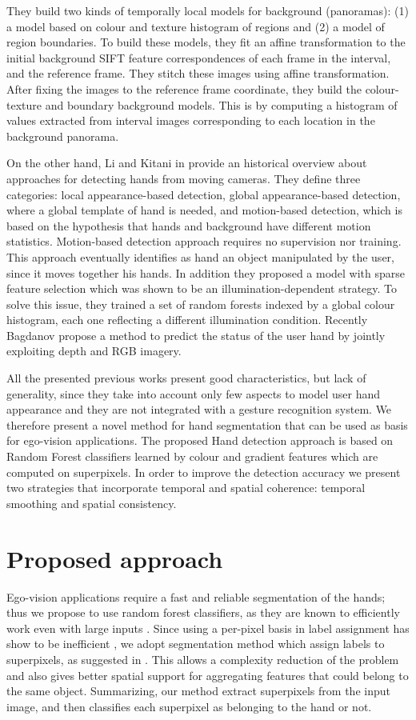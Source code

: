 They build two kinds of temporally local models for background
(panoramas): (1) a model based on colour and texture
histogram of regions and (2) a model of region boundaries.
To build these models, they fit an affine transformation
to the initial background SIFT feature correspondences of
each frame in the interval, and the reference frame. They
stitch these images using affine transformation. After fixing
the images to the reference frame coordinate, they build
the colour-texture and boundary background models. This is
by computing a histogram of values extracted from interval
images corresponding to each location in the background
panorama.

On the other hand, Li and Kitani in \cite{li13} provide an historical overview about approaches for detecting hands from moving cameras. They define three categories: local appearance-based detection, global appearance-based detection, where a global template of hand is needed, and motion-based detection, which is based on the hypothesis that hands and background have different motion statistics. Motion-based detection approach requires no supervision nor training. This approach eventually identifies as hand an object manipulated by the user, since it moves together his hands. In addition they proposed a model with sparse feature selection which was shown to be an illumination-dependent strategy. To solve this issue, they trained a set of random forests indexed by a global colour histogram, each one reflecting a different illumination condition.
Recently Bagdanov \etal \cite{bagdanov12} propose a method to predict the status of the user hand by jointly exploiting depth and RGB imagery.

All the presented previous works present good characteristics, but lack of generality, since they take into account only few aspects to model user hand appearance and they are not integrated with a gesture recognition system. We therefore present a novel method for hand segmentation that can be used as basis for ego-vision applications. 
The proposed Hand detection approach is based on Random Forest classifiers learned by colour and gradient features which are computed on superpixels. In order to improve the detection accuracy we present two strategies that incorporate temporal and spatial coherence: temporal smoothing and spatial consistency.

\section{Proposed approach}
Ego-vision applications require a fast and reliable segmentation of the hands; thus we propose to use random forest classifiers, as they are known to efficiently work even with large inputs \cite{leo01}. Since using a per-pixel basis in label assignment has show to be inefficient \cite{jones99}, we adopt segmentation method which assign labels to superpixels, as suggested in \cite{tighe13}. 
This allows a complexity reduction of the problem and also gives better spatial support for aggregating features that could belong to the same object. Summarizing, our method extract superpixels from the input image, and then classifies each superpixel as belonging to the hand or not.

